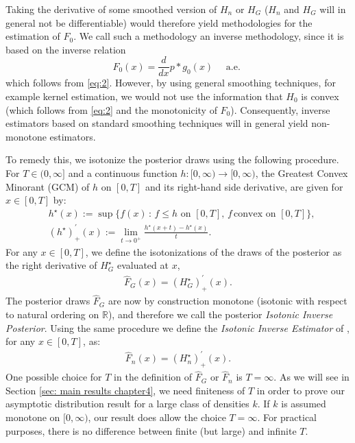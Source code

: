 Taking the derivative of some smoothed version of $H_n$ or $H_{\scriptscriptstyle{G}}$ ($H_n$ and $H_{\scriptscriptstyle{G}}$ will in general not be differentiable) would therefore yield methodologies for the estimation of $F_0$. We call such a methodology an inverse methodology, since it is based on the inverse relation
$$
F_0(x)=\frac{d}{d x} p * g_0(x) \quad \text { a.e. }
$$
which follows from \eqref{eq:2}. However, by using general smoothing techniques, for example kernel estimation, we would not use the information that $H_0$ is convex (which follows from \eqref{eq:2} and the monotonicity of $F_0$). Consequently, inverse estimators based on standard smoothing techniques will in general yield non-monotone estimators. 

To remedy this, we isotonize the posterior draws using the following procedure. For $T \in (0, \infty]$ and a continuous function $h : [0,\infty) \to [0,\infty)$, the Greatest Convex Minorant (GCM) of $h$ on $[0,T]$ and its right-hand side derivative, are given for $x \in [0,T]$ by:
\begin{align*}
    &h^{\star}(x) := \sup {\{ f(x) \, : \, f \leq h \, \, \text{on} \, \, [0,T], \, f \, \text{convex} \, \, \text{on} \, \, [0,T] \}},\\
    & (h^{\star})^{\prime}_+ (x):= \lim_{t \to 0^+} \frac{h^{\star}(x + t) - h^{\star}(x)}{t}.
\end{align*}
For any $x \in [0, T]$, we define the isotonizations of the draws of the posterior as the right derivative of $H_{\scriptscriptstyle{G}}^{\star}$ evaluated at $x$,
\begin{align}\label{eq: def IIP}
	\hat{F}_{\scriptscriptstyle{G}}(x) = (H_{\scriptscriptstyle{G}}^{\star})^{\prime}_+ (x).
\end{align}
The posterior draws $\hat{F}_{\scriptscriptstyle{G}}$ are now by construction monotone (isotonic with respect to natural ordering on $\mathbb{R}$), and therefore we call the posterior \textit{Isotonic Inverse Posterior}. Using the same procedure we define the \textit{Isotonic Inverse Estimator} of \cite{74}, for any $x \in [0, T]$, as:
\begin{align}\label{eq: def IIE}
	\hat{F}_n(x) = (H_n^{\star})^{\prime}_+ (x).
\end{align}
One possible choice for $T$ in the definition of $\hat{F}_{\scriptscriptstyle{G}}$ or $\hat{F}_n$ is $T=\infty$. As we will see in Section \ref{sec: main results chapter4}, we need finiteness of $T$ in order to prove our asymptotic distribution result for a large class of densities $k$. If $k$ is assumed monotone on $[0,\infty)$, our result does allow the choice $T=\infty$. For practical purposes, there is no difference between finite (but large) and infinite $T$. 

